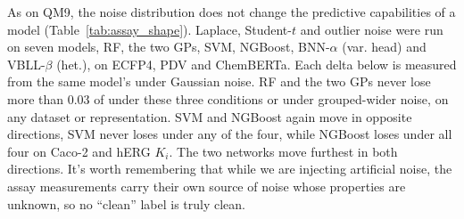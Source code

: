 As on QM9, the noise distribution does not change the predictive capabilities of a model (Table~\ref{tab:assay_shape}). Laplace, Student-$t$ and outlier noise were run on seven models, RF, the two GPs, SVM, NGBoost, BNN-$\alpha$ (var. head) and VBLL-$\beta$ (het.), on ECFP4, PDV and ChemBERTa. Each delta below is measured from the same model's \aucnorm{} under Gaussian noise. RF and the two GPs never lose
more than 0.03 of \aucnorm{} under these three conditions or under grouped-wider noise, on any dataset or representation. SVM and NGBoost again move in opposite directions, SVM never loses \aucnorm{} under any of the four, while NGBoost loses under all four on Caco-2 and hERG $K_i$. The two networks move furthest in both directions. It's worth remembering that while we are injecting artificial noise, the assay measurements carry their own source of noise whose properties are unknown, so no ``clean'' label is truly clean.

